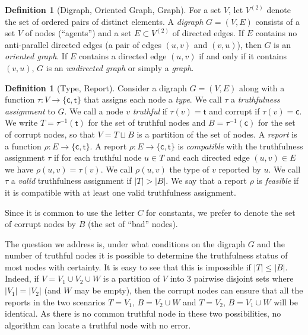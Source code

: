 \documentclass[11pt]{article}
\numberwithin{equation}{section}
\theoremstyle{definition}
\newtheorem{definition}[theorem]{Definition}
\theoremstyle{plain}
\begin{document}
\begin{definition}[Digraph, Oriented Graph, Graph] 
For a set $V$, let $V^{(2)}$ denote the set of ordered pairs of 
distinct elements. 
A \emph{digraph} $G=(V,E)$ consists of a set $V$ of nodes (``agents'') 
and a set $E \subset  V^{(2)}$ of directed edges. If $E$ contains no
anti-parallel directed edges (a pair of edges $(u,v)$ and $(v,u)$), then
$G$ is an \emph{oriented graph}. If $E$ contains a directed edge 
$(u,v)$ if and only if it contains $(v,u)$, $G$ is an 
\emph{undirected graph} or simply a \emph{graph}.
%
\end{definition}
%
%
\begin{definition}[Type, Report]
Consider a
%
digraph    %
$G=(V,E)$ along with a function $\tau : V \to \{\mathsf{c},\mathsf{t}\}$ 
that assigns each node a \emph{type}. We call $\tau$ a 
\emph{truthfulness assignment} to $G$. 
We call a node $v$ \emph{truthful} if $\tau(v) = \mathsf{t}$ and corrupt if $\tau(v) = \mathsf{c}$. 
We write $T = \tau^{-1}(\mathsf{t})$ for the set of truthful nodes and $B =  \tau^{-1}(\mathsf{c})$
for the set of corrupt nodes, so that $V = T \sqcup B$ is a partition of the set of nodes. 
A \emph{report} is a function $\rho: E \to \{\mathsf{c},\mathsf{t}\}$. 
A report $\rho: E \to \{\mathsf{c},\mathsf{t}\}$ is \emph{compatible} with 
the truthfulness assignment $\tau$ if for each truthful node $u \in T$ and each
directed edge $(u, v) \in E$ we have $\rho(u,v) = \tau(v)$.  
We call $\rho(u,v)$ the type of $v$ reported by $u$. 
We call $\tau$ a \emph{valid} truthfulness assignment if $|T| > |B|$. 
We say that a report $\rho$ is \emph{feasible} if
it is compatible with at least one valid truthfulness assignment.
%
%
%
\end{definition}
Since it is common to use the letter $C$ for constants, we prefer to denote the set of corrupt nodes by $B$ (the set of  ``bad'' nodes). 

The question we address is, %
under what conditions on the digraph
$G$ and the number of truthful nodes it is possible to determine 
the truthfulness status of
most nodes %
%
with certainty. %
It is easy to see
that this is impossible if $|T| \leq |B|$. Indeed, if $V=V_1 \cup
V_2 \cup W$ is a partition of $V$ into $3$ pairwise disjoint sets
where $|V_1|=|V_2|$ (and $W$ may be empty),
then the corrupt nodes can ensure that all the reports 
in the two scenarios $T=V_1$, $B=V_2 \cup W$ and $T=V_2$, $B=V_1 \cup W$
will be identical. As there is no common truthful node  in these
two possibilities, no algorithm can locate a truthful
node with no error.
\end{document}
